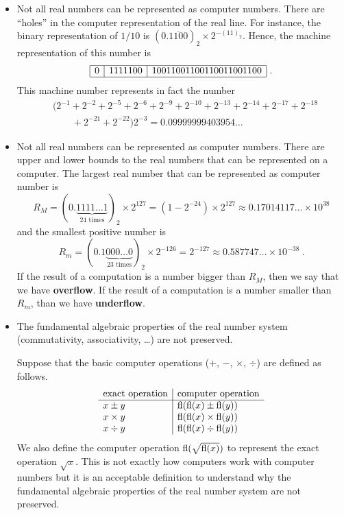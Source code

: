 \begin{itemize}
\item Not all real numbers can be represented as computer numbers.
There are ``holes'' in the computer representation of the real line.
For instance, the binary representation of $1/10$ is
$(0.\overline{1100})_2 \times 2^{-(11)_2}$.  Hence, the machine
representation of this number is
\[
\begin{array}{|c|c|c|}
\hline
0 & 1111100 & 10011001100110011001100 \\
\hline
\end{array} \ .
\]
This machine number represents in fact the number
\begin{align*}
&\big( 2^{-1} + 2^{-2} + 2^{-5} + 2^{-6} + 2^{-9} + 2^{-10} +
2^{-13} + 2^{-14} + 2^{-17} + 2^{-18} \\
&\qquad + 2^{-21} + 2^{-22}\big) 2^{-3} = 0.09999999403954\ldots
\end{align*}
\item Not all real numbers can be represented as computer numbers.
There are upper and lower bounds to the real numbers that can be
represented on a computer. The largest real number that can be
represented as computer number is
\[
R_M =(0.\underbrace{1111\ldots1}_{\text{24 times}})_2 \times 2^{127} =
( 1 - 2^{-24})\times 2^{127} \approx 0.17014117\ldots \times 10^{38}
\]
and the smallest positive number is
\[
R_m =(0.1\underbrace{000\ldots0}_{\text{23 times}})_2 \times 2^{-126}
= 2^{-127} \approx 0.587747\ldots \times 10^{-38}  \ .
\]
If the result of a computation is a number bigger than $R_M$, then we
say that we have {\bfseries overflow}.  If the result
of a computation is a number smaller than $R_m$, than we have
{\bfseries underflow}.

\item The fundamental algebraic properties of the real number system
(commutativity, associativity, \ldots) are not preserved. 

Suppose that the basic computer operations ($+$, $-$, $\times$,
$\div$) are defined as follows. 
\[
\begin{array}{l|l}
\text{exact operation} & \text{computer operation} \\
\hline
x \pm y & \operatorname{fl}(\operatorname{fl}(x) \pm \operatorname{fl}(y)) \\
x \times y & \operatorname{fl}(\operatorname{fl}(x) \times \operatorname{fl}(y))\\
x \div y & \operatorname{fl}(\operatorname{fl}(x) \div \operatorname{fl}(y))
\end{array}
\]
We also define the computer operation $\operatorname{fl}(\sqrt{\operatorname{fl}(x)})$ to
represent the exact operation $\sqrt{x}$.  This is not exactly how
computers work with computer numbers but it is an acceptable
definition to understand why the fundamental algebraic
properties of the real number system are not preserved.


\end{itemize}
